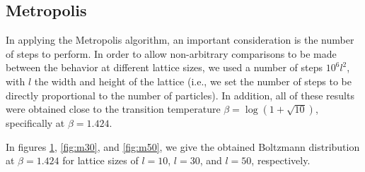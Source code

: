 \documentclass{article}
\begin{document}
\subsection{Metropolis}
\label{sec:metropolis}
In applying the Metropolis algorithm, an important consideration is the number of steps to perform.
In order to allow non-arbitrary comparisons to be made between the behavior at different lattice sizes, we used a number of steps $10^6l^2$, with $l$ the width and height of the lattice (i.e., we set the number of steps to be directly proportional to the number of particles).
In addition, all of these results were obtained close to the transition temperature $\beta = \log(1+\sqrt{10})$, specifically at $\beta = 1.424$.

In figures \ref{fig:m10}, \ref{fig:m30}, and \ref{fig:m50}, we give the obtained Boltzmann distribution at $\beta = 1.424$ for lattice sizes of $l = 10$, $l = 30$, and $l = 50$, respectively.

\begin{figure}[h]
\centering
{}
\label{fig:m10}
\end{figure}
\end{document}
